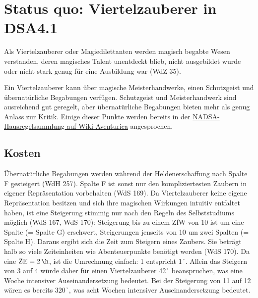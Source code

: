 \section{Status quo: Viertelzauberer in DSA4.1}
Als Viertelzauberer oder Magiedilettanten werden magisch begabte Wesen verstanden, deren magisches Talent unentdeckt blieb, nicht ausgebildet wurde oder nicht stark genug für eine Ausbildung war (WdZ 35).

Ein Viertelzauberer kann über magische Meisterhandwerke, einen Schutzgeist und übernatürliche Begabungen verfügen. Schutzgeist und Meisterhandwerk sind ausreichend gut geregelt, aber übernatürliche Begabungen bieten mehr als genug Anlass zur Kritik. Einige dieser Punkte werden bereits in der \href{http://www.wiki-aventurica.de/wiki/Hausregelsammlung/NADSA/Viertelzauberer}{NADSA-Hausregelsammlung auf Wiki Aventurica} angesprochen.

\subsection{Kosten}
Übernatürliche Begabungen werden während der Heldenerschaffung nach Spalte F gesteigert (WdH 257). Spalte F ist sonst nur den kompliziertesten Zaubern in eigener Repräsentation vorbehalten (WdS 169). Da Viertelzauberer keine eigene Repräsentation besitzen und sich ihre magischen Wirkungen intuitiv entfaltet haben, ist eine Steigerung stimmig nur nach den Regeln des Selbststudiums möglich (WdS 167, WdS 170): Steigerung bis zu einem ZfW von 10 ist um eine Spalte (= Spalte G) erschwert, Steigerungen jenseits von 10 um zwei Spalten (= Spalte H). Daraus ergibt sich die Zeit zum Steigern eines Zaubers. Sie beträgt halb so viele Zeiteinheiten wie Abenteuerpunkte benötigt werden (WdS 170). Da eine $\si{ZE} = \SI{2}{\h}$, ist die Umrechnung einfach: \SI{1}{\AP} entspricht \SI{1}{\h}. Allein das Steigern von 3 auf 4 würde daher für einen Viertelzauberer \SI{42}{\h} beanspruchen, was eine Woche intensiver Auseinandersetzung bedeutet. Bei der Steigerung von 11 auf 12 wären es bereits \SI{320}{\h}, was acht Wochen intensiver Auseinandersetzung bedeutet.

